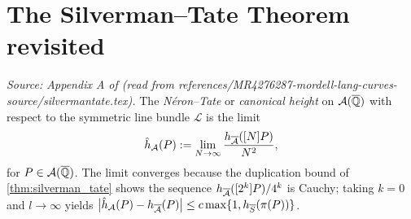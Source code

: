 \section{The Silverman--Tate Theorem revisited}

\begin{definition}
  \label{def:nt_height}
  \textit{Source: Appendix A of \cite{MR4276287-mordell-lang-curves} (read from references/MR4276287-mordell-lang-curves-source/silvermantate.tex).}
  The \emph{Néron--Tate} or \emph{canonical height} on \(\mathcal{A}(\overline{\mathbb{Q}})\) with
  respect to the symmetric line bundle \(\mathcal{L}\) is the limit
  \[
    \hat{h}_{\mathcal{A}}(P) := \lim_{N \to \infty} \frac{h_{\overline{\mathcal{A}}}([N]P)}{N^2},
  \]
  for \(P \in \mathcal{A}(\overline{\mathbb{Q}})\). The limit converges because the duplication
  bound of \cref{thm:silverman_tate} shows the sequence \(h_{\overline{\mathcal{A}}}([2^k]P)/4^k\)
  is Cauchy; taking \(k=0\) and \(l \to \infty\) yields
  \(\bigl|\hat{h}_{\mathcal{A}}(P) - h_{\overline{\mathcal{A}}}(P)\bigr| \le c\max\{1, h_{\overline{S}}(\pi(P))\}\).
\end{definition}
